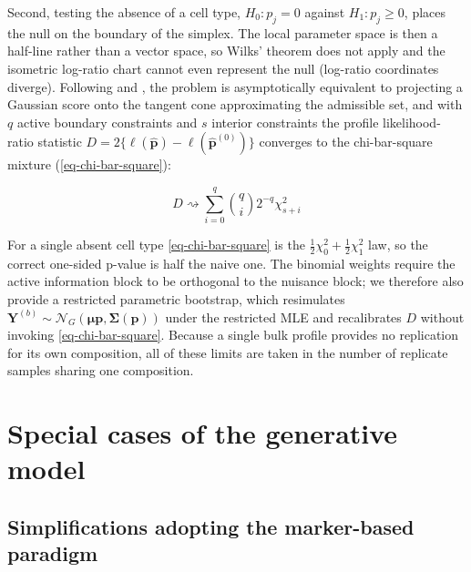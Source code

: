 \documentclass[pdflatex, sn-nature]{sn-jnl}
\theoremstyle{thmstyleone}%
\theoremstyle{thmstyletwo}%
\theoremstyle{thmstylethree}%
\begin{document}
\begin{appendices}
        Second, testing the absence of a cell type, $H_{0}: p_{j}=0$ against
        $H_{1}: p_{j}\ge 0$, places the null on the boundary of the simplex. The
        local parameter space is then a half-line rather than a vector space, so
        Wilks' theorem \cite{wilksLargeSampleDistributionLikelihood1938} does not
        apply and the isometric log-ratio chart cannot even represent the null
        (log-ratio coordinates diverge). Following
        \cite{hermanDistributionLikelihoodRatio1954} and
        \cite{selfAsymptoticPropertiesMaximum1987}, the problem is asymptotically
        equivalent to projecting a Gaussian score onto the tangent cone
        approximating the admissible set, and with $q$ active boundary
        constraints and $s$ interior constraints the profile likelihood-ratio
        statistic $D=2\{\ell(\hat{\boldsymbol{p}})-\ell(\hat{\boldsymbol{p}}^{(0)}
        )\}$ converges to the chi-bar-square mixture
        (\ref{eq-chi-bar-square}):

        \begin{equation}
            \label{eq-chi-bar-square}D \rightsquigarrow \sum_{i=0}^{q} \binom{q}{i}
            2^{-q}\chi^{2}_{s+i}
        \end{equation}

        For a single absent cell type \ref{eq-chi-bar-square} is the
        $\frac{1}{2}\chi^{2}_{0}+\frac{1}{2}\chi^{2}_{1}$ law, so the correct
        one-sided p-value is half the naive one. The binomial weights require the
        active information block to be orthogonal to the nuisance block; we
        therefore also provide a restricted parametric bootstrap, which resimulates
        $\boldsymbol{Y}^{(b)}\sim\mathcal{N}_{G}(\boldsymbol{\mu}\boldsymbol{p},
        \boldsymbol{\Sigma}(\boldsymbol{p}))$ under the restricted MLE and
        recalibrates $D$ without invoking \ref{eq-chi-bar-square}. Because a
        single bulk profile provides no replication for its own composition, all
        of these limits are taken in the number of replicate samples sharing one
        composition.

    \section{Special cases of the generative model}

        \subsection{Simplifications adopting the marker-based paradigm}


\end{appendices}
\end{document}
